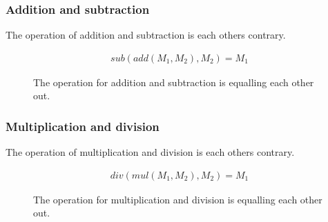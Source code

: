 \subsubsection{Addition and subtraction}
The operation of addition and subtraction is each others contrary.
\begin{figure}[h]
    \begin{align*}
        sub(add(M_1,M_2), M_2) = M_1
    \end{align*}
    \caption{The operation for addition and subtraction is equalling each other out.}
\end{figure}

\FloatBarrier

\subsubsection{Multiplication and division}
The operation of multiplication and division is each others contrary.
\begin{figure}[h]
    \begin{align*}
        div(mul(M_1, M_2), M_2) = M_1
    \end{align*}
    \caption{The operation for multiplication and division is equalling each other out.}
\end{figure}
\FloatBarrier
